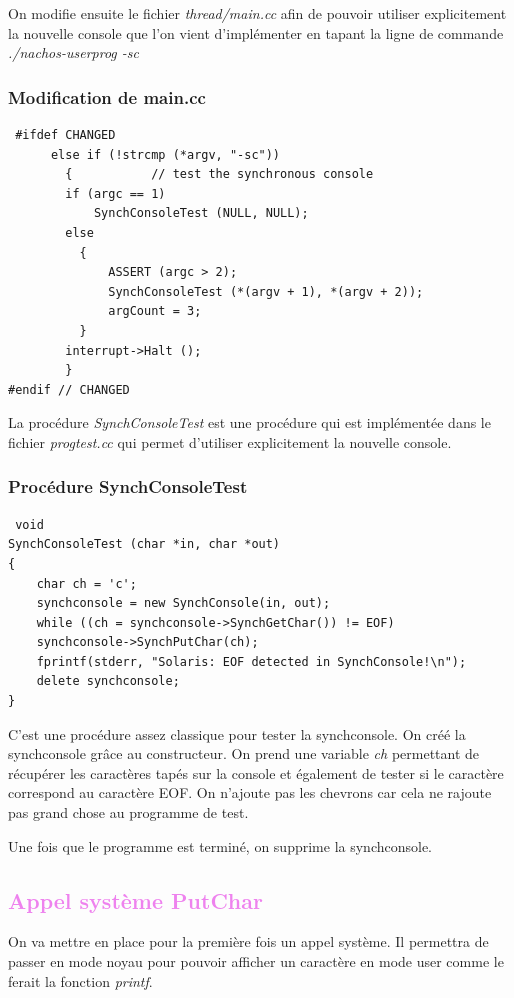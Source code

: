 \documentclass[a4paper,10pt]{article}
\begin{document}
On modifie ensuite le fichier \emph{thread/main.cc} afin de pouvoir utiliser explicitement la nouvelle console que l'on vient d'implémenter en tapant la ligne 
de commande \emph{./nachos-userprog -sc}
\textcolor{TealBlue}{\subsubsection*{Modification de main.cc}}
\begin{lstlisting}
 #ifdef CHANGED
	  else if (!strcmp (*argv, "-sc"))
	    {			// test the synchronous console
		if (argc == 1)
		    SynchConsoleTest (NULL, NULL);
		else
		  {
		      ASSERT (argc > 2);
		      SynchConsoleTest (*(argv + 1), *(argv + 2));
		      argCount = 3;
		  }
		interrupt->Halt ();
	    }
#endif // CHANGED
\end{lstlisting}
La procédure \emph{SynchConsoleTest} est une procédure qui est implémentée dans le fichier \emph{progtest.cc} qui permet d'utiliser explicitement la nouvelle
console.

\textcolor{TealBlue}{\subsubsection*{Procédure SynchConsoleTest}}
\begin{lstlisting}
 void
SynchConsoleTest (char *in, char *out)
{
    char ch = 'c';
    synchconsole = new SynchConsole(in, out);
    while ((ch = synchconsole->SynchGetChar()) != EOF)
    synchconsole->SynchPutChar(ch);
    fprintf(stderr, "Solaris: EOF detected in SynchConsole!\n");
    delete synchconsole;
}
\end{lstlisting}
C'est une procédure assez classique pour tester la synchconsole. On créé la synchconsole grâce au constructeur. On prend une variable \emph{ch} permettant
de récupérer les caractères tapés sur la console et également de tester si le caractère correspond au caractère EOF. On n'ajoute pas les chevrons car cela 
ne rajoute pas grand chose au programme de test.

Une fois que le programme est terminé, on supprime la synchconsole.
\newpage
\textcolor{Violet}{\section{Appel système PutChar}}
  On va mettre en place pour la première fois un appel système. Il permettra de passer en mode noyau pour pouvoir afficher un caractère en mode user comme le
  ferait la fonction \emph{printf}.
  
\end{document}
